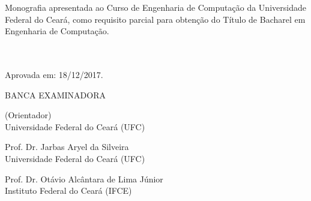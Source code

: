 \begin{folhadeaprovacao}
	
	\begin{center}
		{\MakeUppercase\imprimirautor}
		\vspace{1cm}
		
		\begin{center}
			\MakeUppercase\imprimirtitulo
		\end{center}
		
		\vspace{2cm}
		\hspace{.45\textwidth}
		\begin{minipage}{0.5\textwidth}
			Monografia apresentada ao Curso de Engenharia de Computação da Universidade Federal do Ceará, como requisito parcial para obtenção do Título de Bacharel em Engenharia de Computação.
			\\ \\ \\
		\end{minipage}
		
		\vspace{-0.5cm}
		
		\begin{minipage}{\textwidth}
			Aprovada em: 18/12/2017.
		\end{minipage}
		
		\vspace{0.5cm}
		BANCA EXAMINADORA
	\end{center}
	
	\def\spacebetweensigns{-12pt}
	
	\vspace{\spacebetweensigns}
	\assinatura{}
	\vspace{\spacebetweensigns}
	\begin{center}
		{\imprimirorientador \space (Orientador) \\ Universidade Federal do Ceará (UFC)}
	\end{center}
	

	
	\vspace{\spacebetweensigns}
	\assinatura{}
	\vspace{\spacebetweensigns}
	\begin{center}
		{Prof. Dr. Jarbas Aryel da Silveira \\ Universidade Federal do Ceará (UFC)}
	\end{center}
	
	\vspace{\spacebetweensigns}
	\assinatura{}
	\vspace{\spacebetweensigns}
	\begin{center}
		{Prof. Dr. Otávio Alcântara de Lima Júnior \\ Instituto Federal do Ceará (IFCE)}
	\end{center}
		
\end{folhadeaprovacao}

